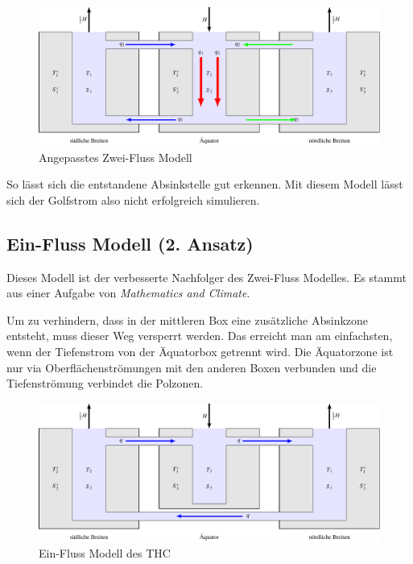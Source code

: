 \begin{figure}
	\centering
	\includegraphics[width=14cm]{thermohalin/tikz/3b2f-inverted.pdf}
	\caption{Angepasstes Zwei-Fluss Modell}
	\label{thermohalin:3b2f-inverted}
\end{figure}

So lässt sich die entstandene Absinkstelle gut erkennen. 
Mit diesem Modell lässt sich der Golfstrom also nicht erfolgreich simulieren. 

\subsection{Ein-Fluss Modell (2. Ansatz)}\label{thermohalin:3b1f_title}

Dieses Modell ist der verbesserte Nachfolger des Zwei-Fluss Modelles.
Es stammt aus einer Aufgabe von {\em Mathematics and Climate}\cite{skript:kaperengler}.

Um zu verhindern, dass in der mittleren Box eine zusätzliche Absinkzone entsteht, muss dieser Weg versperrt werden. Das erreicht man am einfachsten, wenn der Tiefenstrom von der Äquatorbox getrennt wird. Die Äquatorzone ist nur via Oberflächenströmungen mit den anderen Boxen verbunden und die Tiefenströmung verbindet die Polzonen.


\begin{figure}
	\centering
	\includegraphics[width=14cm]{thermohalin/tikz/3b1f.pdf}
	\caption{Ein-Fluss Modell des THC}
	\label{thermohalin:3b1f}
\end{figure}

